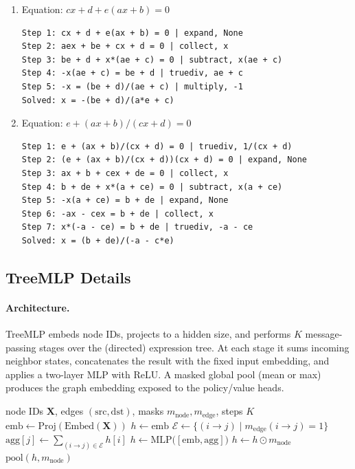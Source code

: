 \documentclass{article}
\theoremstyle{plain}
\theoremstyle{definition}
\theoremstyle{remark}
\begin{document}
\begin{enumerate}
\item Equation: $c x + d + e(a x + b) = 0$
\begin{verbatim}
Step 1: cx + d + e(ax + b) = 0 | expand, None
Step 2: aex + be + cx + d = 0 | collect, x
Step 3: be + d + x*(ae + c) = 0 | subtract, x(ae + c)
Step 4: -x(ae + c) = be + d | truediv, ae + c
Step 5: -x = (be + d)/(ae + c) | multiply, -1
Solved: x = -(be + d)/(a*e + c)
\end{verbatim}
\item Equation: $e + (a x + b)/(c x + d) = 0$
\begin{verbatim}
Step 1: e + (ax + b)/(cx + d) = 0 | truediv, 1/(cx + d)
Step 2: (e + (ax + b)/(cx + d))(cx + d) = 0 | expand, None
Step 3: ax + b + cex + de = 0 | collect, x
Step 4: b + de + x*(a + ce) = 0 | subtract, x(a + ce)
Step 5: -x(a + ce) = b + de | expand, None
Step 6: -ax - cex = b + de | collect, x
Step 7: x*(-a - ce) = b + de | truediv, -a - ce
Solved: x = (b + de)/(-a - c*e)
\end{verbatim}
\end{enumerate}


\subsection{TreeMLP Details}
\label{app:treemlp}

\paragraph{Architecture.}
TreeMLP embeds node IDs, projects to a hidden size, and performs $K$ message-passing stages over the (directed) expression tree.
At each stage it sums incoming neighbor states, concatenates the result with the fixed input embedding, and applies a two-layer MLP with ReLU.
A masked global pool (mean or max) produces the graph embedding exposed to the policy/value heads.

\begin{algorithm}[t]
\caption{TreeMLP message passing and pooling}
\label{alg:treemlp}
\begin{algorithmic}[1]
\Require node IDs $\mathbf{X}$, edges $(\text{src},\text{dst})$, masks $m_{\text{node}}, m_{\text{edge}}$, steps $K$
\State $\text{emb} \leftarrow \mathrm{Proj}(\mathrm{Embed}(\mathbf{X}))$ 
\State $h \leftarrow \text{emb}$
  \State $\mathcal{E} \leftarrow \{(i\!\to\!j) \mid m_{\text{edge}}(i\!\to\!j)=1\}$
  \State $\text{agg}[j] \leftarrow \sum_{(i\to j)\in \mathcal{E}} h[i]$ 
  \State $h \leftarrow \mathrm{MLP}\big([\text{emb}, \text{agg}]\big)$
  \State $h \leftarrow h \odot m_{\text{node}}$ 
\EndFor
\State \Return $\mathrm{pool}(h, m_{\text{node}})$ 
\end{algorithmic}
\end{algorithm}
\end{document}
